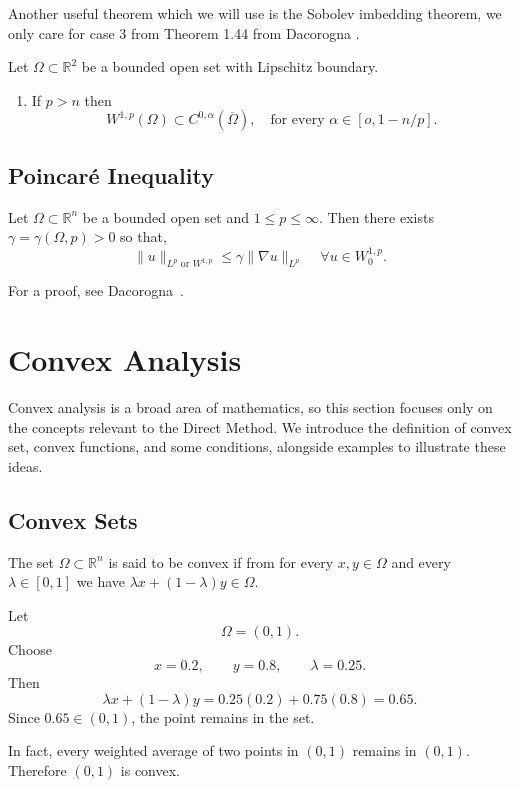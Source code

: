 Another useful theorem which we will use is the Sobolev imbedding theorem, we only care for case 3 from Theorem 1.44 from Dacorogna \cite{dacorogna}.
\begin{theorem}
\label{thm:embedding}
Let $\Omega \subset \mathbb{R}^2$ be a bounded open set with Lipschitz boundary.
\begin{enumerate}
    \item [Case 3.] If $p>n$ then
    \[
    W^{1,p}(\Omega) \subset C^{0,\alpha}(\overline{\Omega}), \quad \text{for every } \alpha \in [o,1-n/p].
    \]
\end{enumerate}
\end{theorem}


\subsection{Poincar\'e Inequality}

\begin{theorem}
    \label{thm:Poincare Inequality}
    Let $\Omega \subset \mathbb{R}^n$ be a bounded open set and $1\leq p \leq \infty$. Then there exists $\gamma = \gamma(\Omega,p) > 0$  so that, 
    $$
        \|u\|_{L^p \text{ or } W^{1,p}} \le \gamma\|\nabla u\|_{L^p}
        \, \quad \forall u \in W^{1,p}_0.
    $$
\end{theorem}
For a proof, see Dacorogna~\cite[p.~45]{dacorogna}.

\section{Convex Analysis}

Convex analysis is a broad area of mathematics, so this section focuses only on the concepts relevant to the Direct Method. We introduce the definition of convex set, convex functions, and some conditions, alongside examples to illustrate these ideas.

\subsection{Convex Sets}

\begin{definition}
    The set $\Omega \subset \mathbb{R}^n$ is said to be convex if from for every $x,y \in \Omega$ and every $\lambda \in [0,1]$ we have $\lambda x + (1-\lambda)y \in \Omega$.
\end{definition}

\begin{example}

 Let
 $$
 \Omega=(0,1).
 $$
 Choose
 $$
 x=0.2,\qquad y=0.8,\qquad \lambda=0.25.
 $$
 Then
 $$
 \lambda x + (1-\lambda)y
 =
 0.25(0.2)+0.75(0.8)
 =
 0.65.
 $$
 Since $0.65 \in (0,1)$, the point remains in the set.

 In fact, every weighted average of two points in $(0,1)$ remains in $(0,1)$. Therefore $(0,1)$ is convex.
\end{example}

